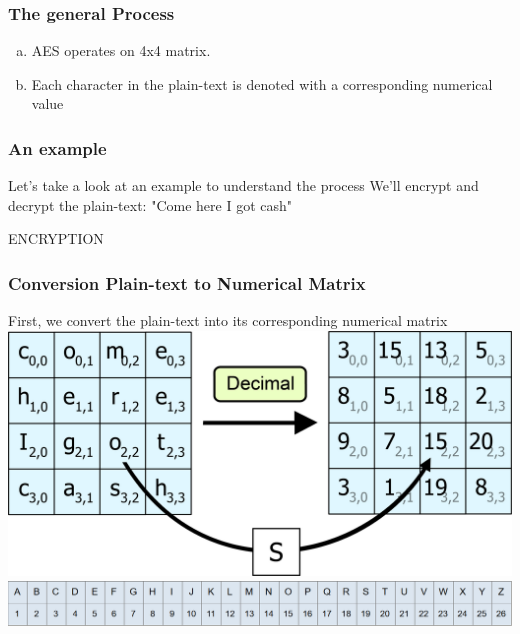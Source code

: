 \documentclass[11pt]{beamer}
\begin{document}
\begin{frame}\frametitle{The general Process}
	\begin{enumerate}[a.]
	\item AES operates on 4x4 matrix.
	\item Each character in the plain-text is denoted with a corresponding numerical value
	\end{enumerate}
\end{frame}

\begin{frame}\frametitle{An example}
\center Let's take a look at an example to understand the process
\center We'll encrypt and decrypt the plain-text:
\center "Come here I got cash"

\end{frame}

\begin{frame}
\center ENCRYPTION
\end{frame}

\begin{frame}\frametitle{Conversion Plain-text to Numerical Matrix}
\footnotesize First, we convert the plain-text into its corresponding numerical matrix 
\center \includegraphics[scale=0.275]{conversion_AES_1}
\center \includegraphics[scale=0.275]{numerical}
\end{frame}
\end{document}
